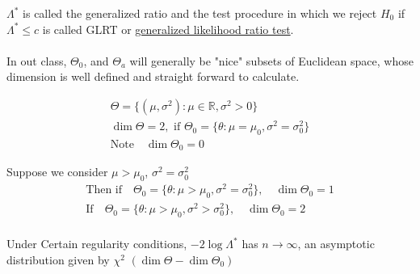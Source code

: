 $\Lambda^*$ is called the generalized ratio and the test procedure in which we reject $H_0$ if $\Lambda^* \leq c$ is called GLRT or \underline{generalized likelihood ratio test}. \\\\
In out class, $\Theta_0$, and $\Theta_a$ will generally be "nice" subsets of Euclidean space, whose dimension is well defined and straight forward to calculate.
\begin{example-N}
	\begin{gather*}
		\Theta = \{ (\mu, \sigma^2) : \mu \in \mathbb{R}, \sigma^2 > 0 \}\\
		\dim \Theta = 2, \text{ if } \Theta_0 = \{ \theta : \mu = \mu_0, \sigma^2 = \sigma_0^2  \} \\
		\text{Note} \quad \dim \Theta_0 = 0
	\end{gather*}
\end{example-N}
Suppose we consider $\mu > \mu_0$, $\sigma^2 = \sigma^2_0$
\begin{gather*}
	\text{Then if} \quad \Theta_0 = \{ \theta: \mu > \mu_0, \sigma^2 = \sigma^2_0 \}, \quad \dim \Theta_0 = 1\\
	\text{If} \quad \Theta_0 = \{ \theta: \mu > \mu_0, \sigma^2 > \sigma^2_0 \}, \quad \dim \Theta_0 = 2\\
\end{gather*}
\begin{theorem}
	Under Certain regularity conditions, $-2 \log \Lambda^*$ has $n \rightarrow \infty$, an asymptotic distribution given by $\chi^2$ $(\dim \Theta - \dim \Theta_0)$
\end{theorem}
